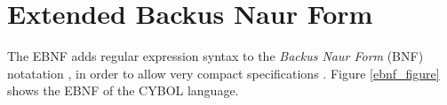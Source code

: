 %
%
%
%
%
%

\section{Extended Backus Naur Form}
\label{extended_backus_naur_form_heading}

The EBNF adds regular expression syntax to the \emph{Backus Naur Form} (BNF)
notatation \cite{naur}, in order to allow very compact specifications
\cite{kuhn}. Figure \ref{ebnf_figure} shows the EBNF of the CYBOL language.

